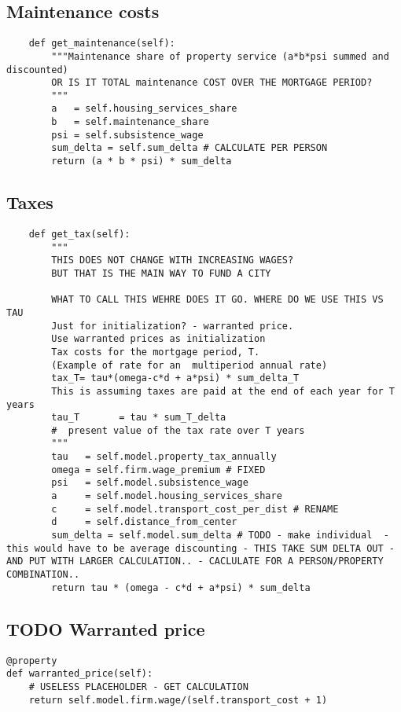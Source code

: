 \subsection{Maintenance costs}
\begin{lstlisting}
    def get_maintenance(self):
        """Maintenance share of property service (a*b*psi summed and discounted)
        OR IS IT TOTAL maintenance COST OVER THE MORTGAGE PERIOD?
        """
        a   = self.housing_services_share
        b   = self.maintenance_share
        psi = self.subsistence_wage
        sum_delta = self.sum_delta # CALCULATE PER PERSON
        return (a * b * psi) * sum_delta
\end{lstlisting}

\subsection{Taxes}
\begin{lstlisting}
    def get_tax(self):
        """ 
        THIS DOES NOT CHANGE WITH INCREASING WAGES?
        BUT THAT IS THE MAIN WAY TO FUND A CITY

        WHAT TO CALL THIS WEHRE DOES IT GO. WHERE DO WE USE THIS VS TAU
        Just for initialization? - warranted price. 
        Use warranted prices as initialization
        Tax costs for the mortgage period, T. 
        (Example of rate for an  multiperiod annual rate)
        tax_T= tau*(omega-c*d + a*psi) * sum_delta_T
        This is assuming taxes are paid at the end of each year for T years
        tau_T       = tau * sum_T_delta 
        #  present value of the tax rate over T years        
        """
        tau   = self.model.property_tax_annually
        omega = self.firm.wage_premium # FIXED
        psi   = self.model.subsistence_wage
        a     = self.model.housing_services_share
        c     = self.model.transport_cost_per_dist # RENAME
        d     = self.distance_from_center
        sum_delta = self.model.sum_delta # TODO - make individual  - this would have to be average discounting - THIS TAKE SUM DELTA OUT - AND PUT WITH LARGER CALCULATION.. - CACLULATE FOR A PERSON/PROPERTY COMBINATION..
        return tau * (omega - c*d + a*psi) * sum_delta
\end{lstlisting}


\subsection{TODO Warranted price}
\begin{lstlisting}
@property
def warranted_price(self):
    # USELESS PLACEHOLDER - GET CALCULATION
    return self.model.firm.wage/(self.transport_cost + 1) 
\end{lstlisting}

